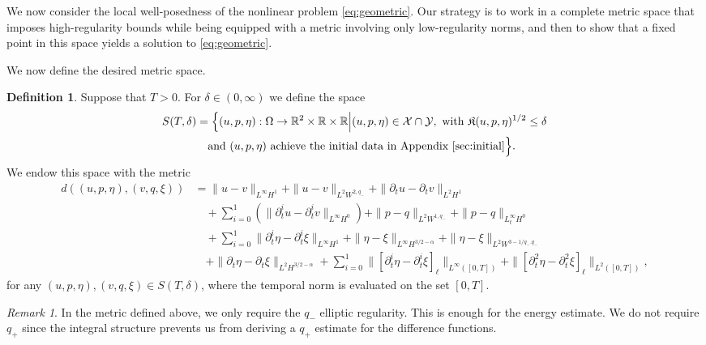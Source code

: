 \documentclass[letterpaper,reqno,10pt,twoside]{amsart}
\theoremstyle{definition}
\newtheorem{definition}{Definition}[section]
\theoremstyle{remark}
\newtheorem{remark}{Remark}[section]
\def\p{\partial}
\def\Om{\Omega}
\begin{document}
		
		We now consider the local well-posedness of the nonlinear problem \eqref{eq:geometric}. Our strategy is to work in a complete metric space that imposes high-regularity bounds while being equipped with a metric involving only low-regularity norms, and then to show that a fixed point in this space yields a solution to \eqref{eq:geometric}.
		
		We now define the desired metric space.
		\begin{definition}\label{def:S}
			Suppose that $T>0$. For $\delta\in(0,\infty)$ we define the space
			\[
			\begin{aligned}
				S(T, \delta)
				&=\Big\{(u,p,\eta):\Om\to\mathbb{R}^2\times\mathbb{R}\times\mathbb{R}\Big|(u,p,\eta)\in\mathcal{X}\cap\mathcal{Y},\ \text{with}\ \mathfrak{K}(u,p,\eta)^{1/2}\le\delta\\
				&\quad\text{and}\ (u,p,\eta)\ \text{achieve the initial data in Appendix \ref{sec:initial}}\Big\}.
			\end{aligned}
			\]
			We endow this space with the metric
			\begin{equation}\label{def:metric}
				\begin{aligned}
					d((u,p,\eta),(v,q,\xi))&=\|u-v\|_{L^\infty H^1}+\|u-v\|_{L^{2}W^{2,q_{-}}}+\|\p_{t}u-\p_{t}v\|_{L^2 H^1}\\&\quad+\sum_{i=0}^{1}(\|\p_{t}^{i}u-\p_{t}^{i}v\|_{L^{\infty}H^{0}})+\|p-q\|_{L^{2}W^{1,q_{-}}}+\|p-q\|_{L_{t}^{\infty}H^{0}}\\&\quad+\sum_{i=0}^{1}\|\p_{t}^{i}\eta-\p_{t}^{i}\xi\|_{L^\infty H^1}
					+\|\eta-\xi\|_{L^\infty H^{3/2-\alpha}}+\|\eta-\xi\|_{L^2 W^{3-1/q_-.q_-}}
					\\
					&\quad+\|\p_t\eta-\p_t\xi\|_{L^2 H^{3/2-\alpha}}+\sum_{i=0}^{1}\|[\p_t^{i}\eta-\p_t^{i}\xi]_\ell\|_{L^\infty([0,T])}+\|[\p_t^2\eta-\p_t^2\xi]_\ell\|_{L^2([0,T])},
				\end{aligned}
			\end{equation}
			for any $(u,p,\eta),(v,q,\xi)\in S(T, \delta)$, where the temporal norm is evaluated on the set $[0,T]$.
		\end{definition}
		
		\begin{remark}
			In the metric defined above, we only require the $q_{-}$ elliptic regularity. This is enough for the energy estimate. We do not require $q_{+}$ since the integral structure prevents us from deriving a $q_{+}$ estimate for the difference functions.
		\end{remark}
		
\end{document}
